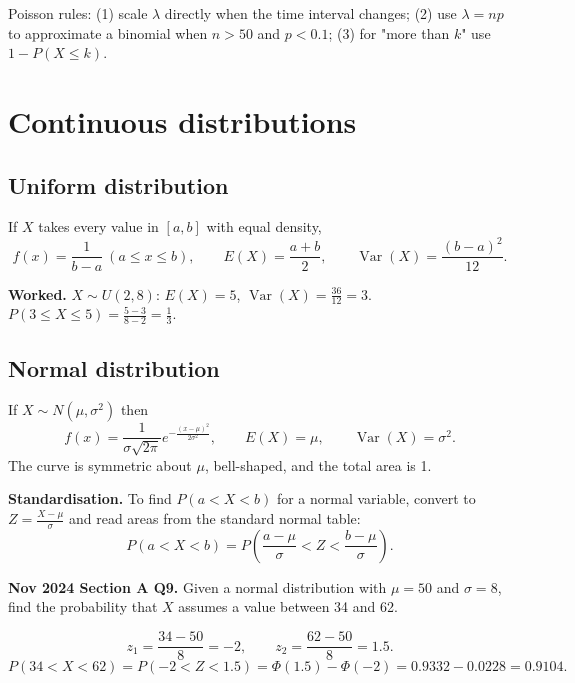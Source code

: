 \documentclass[11pt,a4paper]{article}
\begin{document}
\begin{rememberbox}
Poisson rules: (1) scale $\lambda$ directly when the time interval changes; (2) use $\lambda=np$ to approximate a binomial when $n>50$ and $p<0.1$; (3) for "more than $k$" use $1-P(X\le k)$.
\end{rememberbox}

\section{Continuous distributions}

\subsection{Uniform distribution}
If $X$ takes every value in $[a,b]$ with equal density,
\[
f(x)=\frac1{b-a}\ (a\le x\le b),\qquad E(X)=\frac{a+b}{2},\qquad \operatorname{Var}(X)=\frac{(b-a)^2}{12}.
\]

\begin{exambox}
\textbf{Worked.} $X\sim U(2,8)$: $E(X)=5$, $\operatorname{Var}(X)=\frac{36}{12}=3$. $P(3\le X\le 5)=\frac{5-3}{8-2}=\frac13$.
\end{exambox}

\subsection{Normal distribution}
If $X\sim N(\mu,\sigma^2)$ then
\[
f(x)=\frac{1}{\sigma\sqrt{2\pi}}e^{-\frac{(x-\mu)^2}{2\sigma^2}},\qquad E(X)=\mu,\qquad \operatorname{Var}(X)=\sigma^2.
\]
The curve is symmetric about $\mu$, bell-shaped, and the total area is 1.

\begin{exambox}
\textbf{Standardisation.} To find $P(a<X<b)$ for a normal variable, convert to $Z=\frac{X-\mu}{\sigma}$ and read areas from the standard normal table:
\[
P(a<X<b)=P\left(\frac{a-\mu}{\sigma}<Z<\frac{b-\mu}{\sigma}\right).
\]
\end{exambox}

\begin{pyqbox}
\textbf{Nov 2024 Section A Q9.} Given a normal distribution with $\mu=50$ and $\sigma=8$, find the probability that $X$ assumes a value between 34 and 62.
\end{pyqbox}

\begin{solbox}
\[
z_1=\frac{34-50}{8}=-2,\qquad z_2=\frac{62-50}{8}=1.5.
\]
\[
P(34<X<62)=P(-2<Z<1.5)=\Phi(1.5)-\Phi(-2)=0.9332-0.0228=\boxed{0.9104}.
\]
\end{solbox}
\end{document}
